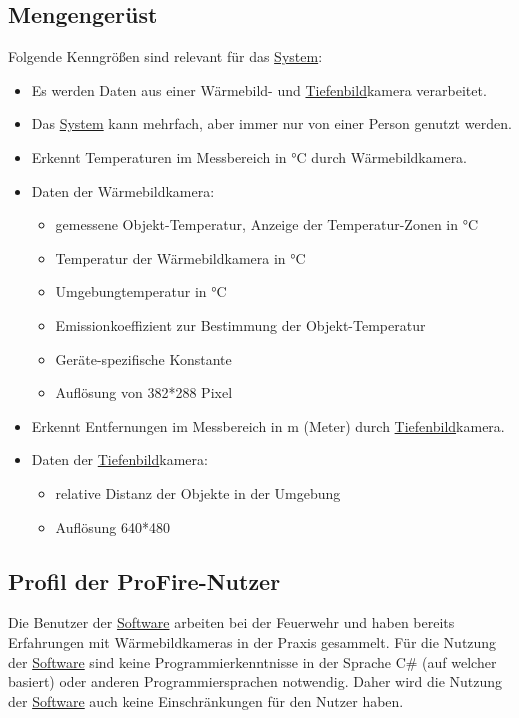 \subsection{Mengengerüst}
Folgende Kenngrößen sind relevant für das \hyperlink{tab:system}{System}:
\begin{itemize}
	\item Es werden Daten aus einer Wärmebild- und \hyperlink{tab:tiefe}{Tiefenbild}kamera verarbeitet.
	\item Das \hyperlink{tab:system}{System} kann mehrfach, aber immer nur von einer Person genutzt werden.
	\item Erkennt Temperaturen im Messbereich in °C durch Wärmebildkamera.
	\item Daten der Wärmebildkamera:
	\begin{itemize}
		\item gemessene Objekt-Temperatur, Anzeige der Temperatur-Zonen in °C 
		\item Temperatur der Wärmebildkamera in °C
		\item Umgebungtemperatur in °C
		\item Emissionkoeffizient zur Bestimmung der Objekt-Temperatur
		\item Geräte-spezifische Konstante
		\item Auflösung von 382*288 Pixel
	\end{itemize}
	\item Erkennt Entfernungen im Messbereich in m (Meter) durch \hyperlink{tab:tiefe}{Tiefenbild}kamera.
	\item Daten der \hyperlink{tab:tiefe}{Tiefenbild}kamera:
	\begin{itemize}
		\item relative Distanz der Objekte in der Umgebung
		\item Auflösung 640*480
	\end{itemize}
\end{itemize}

\subsection{Profil der ProFire-Nutzer}
Die Benutzer der \hyperlink{tab:anwendung}{Software} arbeiten bei der Feuerwehr und haben bereits Erfahrungen mit Wärmebildkameras in der Praxis gesammelt.
Für die Nutzung der \hyperlink{tab:anwendung}{Software} \profire sind keine Programmierkenntnisse in der Sprache C\# (auf welcher \profire basiert) oder anderen Programmiersprachen notwendig.
Daher wird die Nutzung der \hyperlink{tab:anwendung}{Software} auch keine Einschränkungen für den Nutzer haben.

